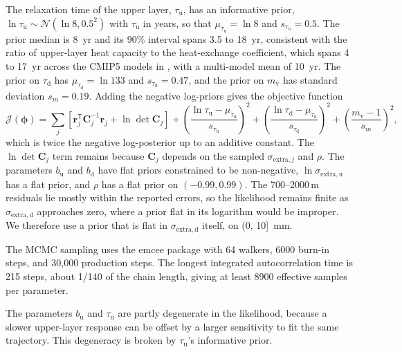 \documentclass[draft,linenumbers]{agujournal2025}
\begin{document}
The relaxation time of the upper layer, $\tau_{\mathrm{u}}$, has an informative prior, $\ln\tau_{\mathrm{u}} \sim \mathcal{N}(\ln 8, 0.5^2)$ with $\tau_{\mathrm{u}}$ in years, so that $\mu_{\tau_{\mathrm{u}}} = \ln 8$ and $s_{\tau_{\mathrm{u}}} = 0.5$. The prior median is 8~yr and its 90\% interval spans 3.5 to 18~yr, consistent with the ratio of upper-layer heat capacity to the heat-exchange coefficient, which spans 4 to 17~yr across the CMIP5 models in \citet[][Table 4]{Geoffroy2013}, with a multi-model mean of 10~yr. The prior on $\tau_{\mathrm{d}}$ has $\mu_{\tau_{\mathrm{d}}} = \ln 133$ and $s_{\tau_{\mathrm{d}}} = 0.47$, and the prior on $m_{\mathrm{v}}$ has standard deviation $s_{m} = 0.19$. Adding the negative log-priors gives the objective function
      \begin{equation}
      \mathcal{J}(\boldsymbol{\phi}) = \sum_{j} \left[\mathbf{r}_j^{\mathsf{T}}\mathbf{C}_j^{-1}\mathbf{r}_j + \ln\det\mathbf{C}_j\right] + \left(\frac{\ln\tau_{\mathrm{u}} - \mu_{\tau_{\mathrm{u}}}}{s_{\tau_{\mathrm{u}}}}\right)^2 + \left(\frac{\ln\tau_{\mathrm{d}} - \mu_{\tau_{\mathrm{d}}}}{s_{\tau_{\mathrm{d}}}}\right)^2 + \left(\frac{m_{\mathrm{v}} - 1}{s_{m}}\right)^2,
      \label{eq:thermo_objective}
      \end{equation}
which is twice the negative log-posterior up to an additive constant. The $\ln\det\mathbf{C}_j$ term remains because $\mathbf{C}_j$ depends on the sampled $\sigma_{\mathrm{extra},j}$ and $\rho$. The parameters $b_{\mathrm{u}}$ and $b_{\mathrm{d}}$ have flat priors constrained to be non-negative, $\ln\sigma_{\mathrm{extra,u}}$ has a flat prior, and $\rho$ has a flat prior on $(-0.99, 0.99)$. The 700--2000\,m residuals lie mostly within the reported errors, so the likelihood remains finite as $\sigma_{\mathrm{extra,d}}$ approaches zero, where a prior flat in its logarithm would be improper. We therefore use a prior that is flat in $\sigma_{\mathrm{extra,d}}$ itself, on (0, 10]~mm.

The MCMC sampling uses the emcee package with 64 walkers, 6000 burn-in steps, and 30,000 production steps. The longest integrated autocorrelation time is 215 steps, about 1/140 of the chain length, giving at least 8900 effective samples per parameter.

The parameters $b_{\mathrm{u}}$ and $\tau_{\mathrm{u}}$ are partly degenerate in the likelihood, because a slower upper-layer response can be offset by a larger sensitivity to fit the same trajectory. This degeneracy is broken by $\tau_{\mathrm{u}}$'s informative prior.
\end{document}
